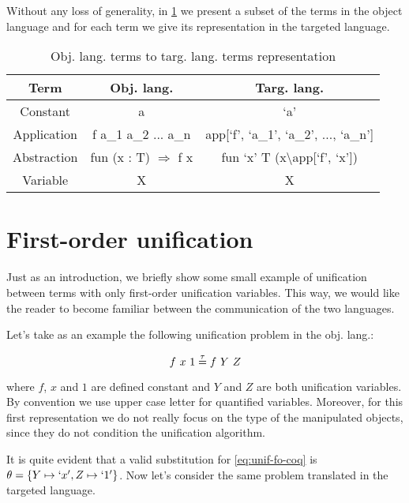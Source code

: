 \documentclass{rapport}
\begin{document}
Without any loss of generality, in \cref{table:coq2elpi} we present a subset of
the terms in the object language and for each term we give its representation in
the targeted language.

  
\begin{table}
  \centering
  \begin{tabular}{c||c|c}
  Term        & Obj. lang.                    & Targ. lang.                                   \\
  \hline\hline
  Constant    & a                             & `a'                                     \\
  Application & f a\_1 a\_2 ... a\_n          & app{[}`f', `a\_1', `a\_2', ..., `a\_n'{]}     \\
  Abstraction & fun (x : T) $\Rightarrow$ f x & fun `x' T (x\textbackslash app{[}`f', `x'{]}) \\
  Variable    & X                             & X                                             \\
  \end{tabular}
  \caption{Obj. lang. terms to targ. lang. terms representation}
  \label{table:coq2elpi}
\end{table}

\section{First-order unification}

Just as an introduction, we briefly show some small example of unification
between terms with only first-order unification variables. This way, we would
like the reader to become familiar between the communication of the two
languages.

Let's take as an example the following unification problem in the obj. lang.: 

\begin{equation}
  f\ x\ 1 \mathrel{\overset{\mathrm{\tau}}{=}} f\ Y\ Z
  \label{eq:unif-fo-coq}
\end{equation}

\noindent where $f$, $x$ and $1$ are defined constant and $Y$ and $Z$ are both
unification variables. By convention we use upper case letter for quantified
variables. Moreover, for this first representation we do not really focus on the
type of the manipulated objects, since they do not condition the unification
algorithm.

It is quite evident that a valid substitution for \cref{eq:unif-fo-coq} is $\theta =
\{Y \mapsto `x', Z \mapsto `1'\}$. Now let's consider the same problem translated in
the targeted language.
\end{document}
